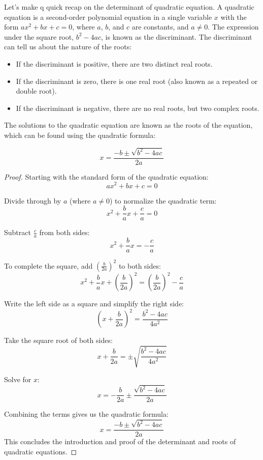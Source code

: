 Let's make q quick recap on the determinant of quadratic equation.
A quadratic equation is a second-order polynomial equation in a single variable \(x\) with the form \(ax^2 + bx + c = 0\), where \(a\), \(b\), and \(c\) are constants, and \(a \neq 0\). 
The expression under the square root, \(b^2 - 4ac\), is known as the discriminant. The discriminant can tell us about the nature of the roots:
\begin{itemize}
\item If the discriminant is positive, there are two distinct real roots.
\item If the discriminant is zero, there is one real root (also known as a repeated or double root).
\item If the discriminant is negative, there are no real roots, but two complex roots.
\end{itemize}
The solutions to the quadratic equation are known as the roots of the equation, which can be found using the quadratic formula:
\begin{theorem}
    \[ x = \frac{{-b \pm \sqrt{{b^2 - 4ac}}}}{2a} \]
\end{theorem}
\begin{proof}
    Starting with the standard form of the quadratic equation:
\[ ax^2 + bx + c = 0 \]

Divide through by \(a\) (where \(a \neq 0\)) to normalize the quadratic term:
\[ x^2 + \frac{b}{a}x + \frac{c}{a} = 0 \]

Subtract \(\frac{c}{a}\) from both sides:
\[ x^2 + \frac{b}{a}x = -\frac{c}{a} \]

To complete the square, add \(\left(\frac{b}{2a}\right)^2\) to both sides:
\[ x^2 + \frac{b}{a}x + \left(\frac{b}{2a}\right)^2 = \left(\frac{b}{2a}\right)^2 - \frac{c}{a} \]

Write the left side as a square and simplify the right side:
\[ \left(x + \frac{b}{2a}\right)^2 = \frac{b^2 - 4ac}{4a^2} \]

Take the square root of both sides:
\[ x + \frac{b}{2a} = \pm \sqrt{\frac{b^2 - 4ac}{4a^2}} \]

Solve for \(x\):
\[ x = -\frac{b}{2a} \pm \frac{\sqrt{b^2 - 4ac}}{2a} \]

Combining the terms gives us the quadratic formula:
\[ x = \frac{-b \pm \sqrt{b^2 - 4ac}}{2a} \]
This concludes the introduction and proof of the determinant and roots of quadratic equations.
\end{proof}

